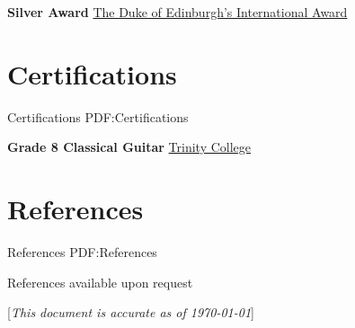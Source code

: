 \documentclass[a4paper,10pt,oneside]{article}
\newcommand{\CVNote}{This document is accurate as of {\today}}
\begin{document}
\begin{body}
\par \textbf{Silver Award}
\href{http://www.dukeofed.com.au/}{The Duke of Edinburgh’s International Award}
\hfill {}

\section
{Certifications}
{Certifications}
{PDF:Certifications}





\textbf{Grade 8 Classical Guitar}
\href{http://www.trinitycollege.com/}{Trinity College}
\hfill {}



\section
{References}
{References}
{PDF:References}



\par References available upon request

\end{body}


\begin{flushright}
\scriptsize%
[\textit{\CVNote}]%
\hspace{2.0mm}\null
\end{flushright}

\label{LastPage}~
\end{document}
